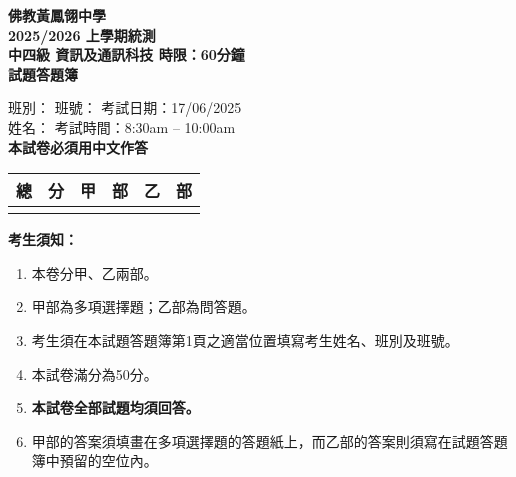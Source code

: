 \documentclass[12pt,a4paper]{article}
\newcommand{\answerline}[1]{\underline{\hspace{#1}}}
\newcommand{\examyear}{2025/2026}           %
\newcommand{\semester}{上學期}              %
\newcommand{\examtype}{統測}                %
\newcommand{\gradelevel}{中四級}            %
\newcommand{\subject}{資訊及通訊科技}       %
\newcommand{\timelimit}{60分鐘}             %
\newcommand{\examdate}{17/06/2025}          %
\newcommand{\examtime}{8:30am -- 10:00am}   %
\newcommand{\totalscore}{50}               %
\begin{document}
\begin{center}
{\fontsize{14pt}{16.8pt}\selectfont\bfseries 佛教黃鳳翎中學}\\[0.5em]
{\fontsize{14pt}{16.8pt}\selectfont\bfseries \examyear{} \semester{}\examtype{}}\\[1em]
{\fontsize{14pt}{16.8pt}\selectfont\bfseries \gradelevel{} \quad \subject{} \quad 時限：\timelimit{}}\\[1.5em]
{\fontsize{14pt}{16.8pt}\selectfont\bfseries 試題答題簿}
\end{center}

\vspace{1.5em}

\fontsize{12pt}{14.4pt}\selectfont

班別：\answerline{3cm} \quad 班號：\answerline{2cm} \quad 考試日期：\examdate{}\\[0.8em]
姓名：\answerline{8cm} \quad 考試時間：\examtime{}\\[0.8em]

\textbf{本試卷必須用中文作答}

\vspace{1em}

\begin{center}
\begin{tabular}{|c|c|c|}
\hline
總　分 & 甲　部 & 乙　部 \\
\hline
& & \\
\hline
\end{tabular}
\end{center}

\vspace{1em}

\textbf{考生須知：}
\begin{enumerate}
\item 本卷分甲、乙兩部。
\item 甲部為多項選擇題；乙部為問答題。
\item 考生須在本試題答題簿第1頁之適當位置填寫考生姓名、班別及班號。
\item 本試卷滿分為\totalscore{}分。
\item \textbf{本試卷全部試題均須回答。}
\item 甲部的答案須填畫在多項選擇題的答題紙上，而乙部的答案則須寫在試題答題簿中預留的空位內。
\end{enumerate}

\newpage
\end{document}

